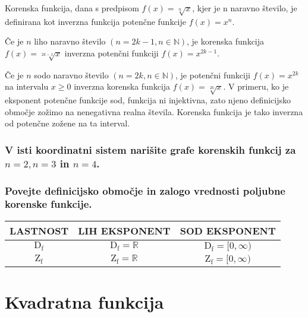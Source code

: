 \documentclass{article}
\begin{document}
Korenska funkcija, dana s predpisom $f(x)=\sqrt[n]{x}$, kjer je $\mathrm{n}$ naravno število, je definirana kot inverzna funkcija potenčne funkcije $f(x)=x^{n}$.

Če je $n$ liho naravno število $(n=2 k-1, n \in \mathbb{N})$, je korenska funkcija $f(x)=\sqrt[2 k-1]{x}$ inverzna potenčni funkciji $f(x)=x^{2 k-1}$.

Če je $n$ sodo naravno število $(n=2 k, n \in \mathbb{N})$, je potenčni funkciji $f(x)=x^{2 k}$ na intervalu $x \geq 0$ inverzna korenska funkcija $f(x)=\sqrt[2 k]{x}$. V primeru, ko je eksponent potenčne funkcije sod, funkcija ni injektivna, zato njeno definicijsko območje zožimo na nenegativna realna števila. Korenska funkcija je tako inverzna od potenčne zožene na ta interval.

\subsubsection*{V isti koordinatni sistem narišite grafe korenskih funkcij za $n=2, n=3$ in $n=4$.}



\subsubsection*{Povejte definicijsko območje in zalogo vrednosti poljubne korenske funkcije.}

\begin{center}
\begin{tabular}{|c|c|c|}
\hline
LASTNOST & LIH EKSPONENT & SOD EKSPONENT \\
\hline
$\mathrm{D}_{\mathrm{f}}$ & $\mathrm{D}_{\mathrm{f}}=\mathbb{R}$ & $\mathrm{D}_{\mathrm{f}}=[0, \infty)$ \\
\hline
$\mathrm{Z}_{\mathrm{f}}$ & $\mathrm{Z}_{\mathrm{f}}=\mathbb{R}$ & $\mathrm{Z}_{\mathrm{f}}=[0, \infty)$ \\
\hline
\end{tabular}
\end{center}

\section{Kvadratna funkcija}
\end{document}
